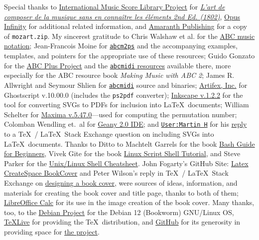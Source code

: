 \documentclass[a4paper,x11names,svgnames,10pt]{article}
\begin{document}
{Special thanks to \href{https://imslp.org}{International Music Score Library Project} for \href{https://imslp.org/wiki/L'art\_de_composer\_de\_la_musique\_sans\_en\_conna\%C3\%AEtre\_les\_\%C3\%A9l\%C3\%A9ments\_(Calegari\%2C\_Antonio)}{\it L'art de composer de la musique sans en connaître les éléments  2nd Ed. (1802)}, \href{https://opus-infinity.org}{Opus Infinity} for additional related information, and \href{http://www.amaranthpublishing.com/MozartDiceGame.htm}{Amaranth Publishing} for a copy of {\tt mozart.zip}. My sincerest gratitude to Chris Walshaw et al. for the \href{http://www.abcnotation.com/}{ABC music notation}; Jean-Francois Moine for \href{http://moinejf.free.fr/}{\tt abcm2ps} and the accompanying examples, templates, and pointers for the appropriate use of these resources; Guido Gonzato for the \href{http://abcplus.sourceforge.net/}{ABC Plus Project} and the \href{http://abcplus.sourceforge.net/#abcMIDI}{{\tt abcmidi} resources} available there, more especially for the ABC resource book {\em Making Music with ABC 2}; James R. Allwright and Seymour Shlien for \href{http://abc.sourceforge.net/abcMIDI}{\tt abcmidi} source and binaries; \href{https://artifex.com/}{Artifex, Inc.} for Ghostscript v.10.00.0 (includes the {\tt ps2pdf} converter); \href{https://www.inkscape.org/}{Inkscape v.1.2.2} for the tool for converting SVGs to PDFs for inclusion into \LaTeX\ documents; William Schelter for \href{https://maxima.sourceforge.io}{Maxima v.5.47.0}---used for computing the permutation number; Colomban Wendling et.\ al for \href{https://www.geany.org}{Geany 2.0 IDE}; and \href{https://tex.stackexchange.com/users/632/martin-h}{\tt User:Martin H} for his \href{https://tex.stackexchange.com/questions/2099/how-to-include-svg-diagrams-in-latex}{reply} to a \TeX\ / \LaTeX\ Stack Exchange question on including SVGs into \LaTeX\ documents. Thanks to  Ditto to Machtelt Garrels for the book \href{http://tldp.org/LDP/Bash-Beginners-Guide/html/Bash-Beginners-Guide.html}{Bash Guide for Beginners}, Vivek Gite for the book \href{http://www.freeos.com/guides/lsst/}{Linux Script Shell Tutorial}, and Steve Parker for the \href{http://steve-parker.org/sh/cheatsheet.pdf}{Unix/Linux Shell Cheatsheet}. John Fogarty's GitHub Site: \href{https://github.com/jfogarty/latex-createspace-bookcover}{Latex CreateSpace BookCover} and Peter Wilson's reply in  \TeX\ / \LaTeX\ Stack Exchange on \href{https://tex.stackexchange.com/questions/17579/how-can-i-design-a-book-cover}{designing a book cover}, were sources of ideas, information, and materials for creating the book cover and title page, thanks to both of them; \href{http://www.libreoffice.org/}{LibreOffice Calc} for its use in the image creation of the book cover.  Many thanks, too, to the \href{https://www.debian.org}{Debian Project} for the Debian 12 (Bookworm) GNU/Linux OS, \href{http://www.tug.org/texlive/}{TeXLive} for providing the \TeX\ distribution,  and \href{https://github.com}{GitHub} for its generosity in providing space for \href{https://github.com/justineuro/mdgBookSVG6Kit}{the project}.  

}
\end{document}
